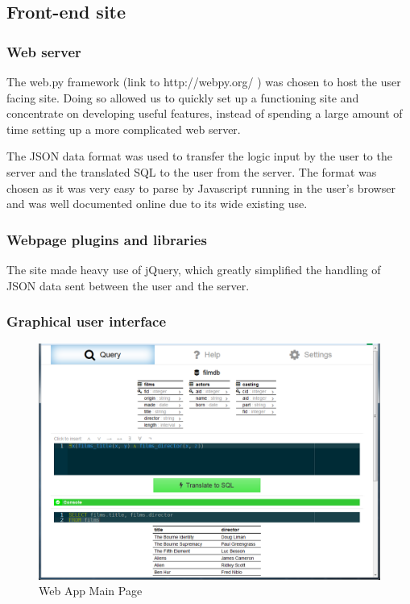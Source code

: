 \documentclass[a4paper, 11pt]{article}
\begin{document}
  \subsection{Front-end site}
    \subsubsection{Web server}
      The web.py framework (link to http://webpy.org/ ) was chosen to host the
      user facing site. Doing so allowed us to quickly set up a functioning site
      and concentrate on developing useful features, instead of spending a large
      amount of time setting up a more complicated web server.

      The JSON data format was used to transfer the logic input by the user to the
      server and the translated SQL to the user from the server. The format was
      chosen as it was very easy to parse by Javascript running in the user's
      browser and was well documented online due to its wide existing use.

    \subsubsection{Webpage plugins and libraries}
      The site made heavy use of jQuery, which greatly simplified the handling
      of JSON data sent between the user and the server.  

    \subsubsection{Graphical user interface}
      \begin{figure}[h!]
        \includegraphics[width=\textwidth]{images/Site.png}
        \caption{Web App Main Page}
      \end{figure}
\end{document}
